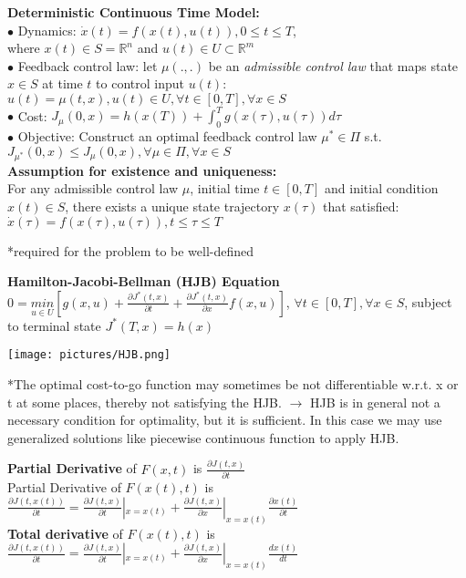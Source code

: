\documentclass[10pt,landscape]{article}
\newenvironment{Figure}
{\par\medskip\noindent\minipage{\linewidth}}
{\endminipage\par\medskip}
\begin{document}
\begin{multicols*}{4}
\textbf{Deterministic Continuous Time Model:}\\
$\bullet$ Dynamics: $\dot{x}(t) = f(x(t),u(t)), 0 \leq t \leq T$,\\
where $x(t) \in S=\mathbb{R}^n$ and $u(t)\in U \subset \mathbb{R}^m$\\
$\bullet$ Feedback control law: let $\mu(.,.)$ be an \textit{admissible control law} that maps state $x \in S$ at time $t$ to control input $u(t)$: $u(t) = \mu (t,x), u(t)\in U, \forall t \in [0,T], \forall x\in S$\\
$\bullet$ Cost: $J_{\mu}(0,x) = h(x(T)) + \int_{0}^{T}g(x(\tau),u(\tau)) d\tau$\\
$\bullet$ Objective: Construct an optimal feedback control law $\mu^{*} \in \Pi$ s.t. $J_{\mu^{*}} (0,x) \leq J_{\mu} (0,x), \forall \mu \in \Pi, \forall x \in S$\\

\textbf{Assumption for existence and uniqueness: }\\
For any admissible control law $\mu$, initial time $t \in [0,T]$  and initial condition $x(t) \in S$, there exists a unique state trajectory $x(\tau)$ that satisfied: $\dot{x}(\tau) = f(x(\tau),u(\tau)), t \leq \tau \leq T$

*required for the problem to be well-defined

\textbf{Hamilton-Jacobi-Bellman (HJB) Equation}\\
$ 0 = \underset{u \in U}{min} [g(x,u) + \frac{\partial J^{*}(t,x)}{\partial t} + \frac{\partial J^{*}(t,x)}{\partial x}f(x,u)]$, $\forall t \in [0,T], \forall x \in S$, subject to terminal state $J^{*}(T,x) = h(x)$\\

\begin{Figure}
	\centering
	\texttt{[image: pictures/HJB.png]}
\end{Figure}

*The optimal cost-to-go function may sometimes be not differentiable w.r.t. x or t at some places, thereby not satisfying the HJB. $\rightarrow$ HJB is in general not a necessary condition for optimality, but it is sufficient.
In this case we may use generalized solutions like piecewise continuous function to apply HJB.

\textbf{Partial Derivative} of $F(x,t)$ is $\frac{\partial J(t,x)}{\partial t}$\\
Partial Derivative of $F(x(t),t)$ is
$\frac{\partial J(t,x(t))}{\partial t} = \frac{\partial J(t,x)}{\partial t}|_{x=x(t)} + \frac{\partial J(t,x)}{\partial x}|_{x=x(t)} \frac{\partial x(t)}{\partial t}$\\
\textbf{Total derivative} of $F(x(t),t)$ is
$\frac{\partial J(t,x(t))}{\partial t} = \frac{\partial J(t,x)}{\partial t}|_{x=x(t)} + \frac{\partial J(t,x)}{\partial x}|_{x=x(t)} \frac{dx(t)}{dt}$


\end{multicols*}
\end{document}
